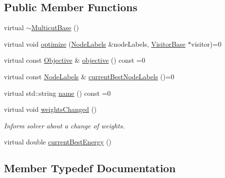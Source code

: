 \subsection*{Public Member Functions}
\begin{DoxyCompactItemize}
\item 
virtual \hyperlink{classnifty_1_1graph_1_1MulticutBase_aeeb6d7ebf88061a676f07025944aa403}{$\sim$\+Multicut\+Base} ()
\item 
virtual void \hyperlink{classnifty_1_1graph_1_1MulticutBase_a50abf0e0069d0c1873fb2d0069179ba9}{optimize} (\hyperlink{classnifty_1_1graph_1_1MulticutBase_afba61ad2919d0fad20b3745af19309da}{Node\+Labels} \&node\+Labels, \hyperlink{classnifty_1_1graph_1_1MulticutBase_a5882fb69df59d8113f6a81a0dac26eaa}{Visitor\+Base} $\ast$visitor)=0
\item 
virtual const \hyperlink{classnifty_1_1graph_1_1MulticutBase_a7d014a4aa2d6e8fa3cd58b70b95ca829}{Objective} \& \hyperlink{classnifty_1_1graph_1_1MulticutBase_a25b622bf14da660a3d24d022369e510d}{objective} () const  =0
\item 
virtual const \hyperlink{classnifty_1_1graph_1_1MulticutBase_afba61ad2919d0fad20b3745af19309da}{Node\+Labels} \& \hyperlink{classnifty_1_1graph_1_1MulticutBase_ac3927bec2b20026187a4c81d490234a2}{current\+Best\+Node\+Labels} ()=0
\item 
virtual std\+::string \hyperlink{classnifty_1_1graph_1_1MulticutBase_aabd27e510ee958a9764ba2305fccc880}{name} () const  =0
\item 
virtual void \hyperlink{classnifty_1_1graph_1_1MulticutBase_a4c7a44afdc661993b3252dba62b5386f}{weights\+Changed} ()
\begin{DoxyCompactList}\small\item\em Inform solver about a change of weights. \end{DoxyCompactList}\item 
virtual double \hyperlink{classnifty_1_1graph_1_1MulticutBase_ad5d1c4f60fc6134ebc418e241f02a2c4}{current\+Best\+Energy} ()
\end{DoxyCompactItemize}


\subsection{Member Typedef Documentation}
\hypertarget{classnifty_1_1graph_1_1MulticutBase_aaeefe3c5df81d9c9efffec878cf2fcd7}{}
